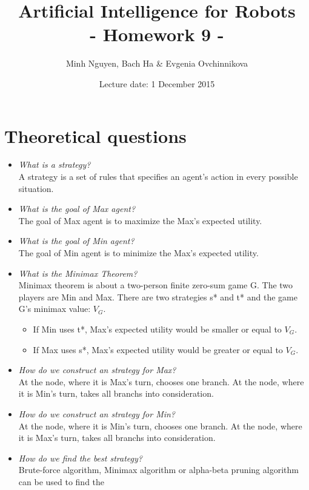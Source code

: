 \documentclass[a4paper, 12pt]{article}
\title{Artificial Intelligence for Robots \\
				- Homework 9 -}
\author{Minh Nguyen, Bach Ha \& Evgenia Ovchinnikova}
\date{Lecture date: 1 December 2015}
\begin{document}
\maketitle

\section{Theoretical questions}
    \begin{itemize}
        \item \emph{What is a strategy?}\\
            A strategy is a set of rules that specifies an agent's action in every possible situation.
        \item \emph{What is the goal of Max agent?}\\
        	The goal of Max agent is to maximize the Max’s expected utility.
        \item \emph{What is the goal of Min agent?}\\
        	The goal of Min agent is to minimize the Max’s expected utility.
        \item \emph{What is the Minimax Theorem?}\\
        	Minimax theorem is about a two-person finite zero-sum game G. The two players are Min and Max.
        		There are two strategies s* and t* and the game G's minimax value: $V_G$.
        	\begin{itemize}
        		\item If Min uses t*, Max's expected utility would be smaller or equal to $V_G$.
        		\item If Max uses s*, Max's expected utility would be greater or equal to $V_G$.
			\end{itemize}      
		\item \emph{How do we construct an strategy for Max?}\\
			At the node, where it is Max's turn, chooses one branch. At the node, where it is Min's turn, 
			takes all branchs into consideration.
		\item \emph{How do we construct an strategy for Min?}\\
			At the node, where it is Min's turn, chooses one branch. At the node, where it is Max's turn, 
			takes all branchs into consideration.	
		\item \emph{How do we find the best strategy?}\\
			Brute-force algorithm, Minimax algorithm or alpha-beta pruning algorithm can be used to find the

\end{itemize}
\end{document}
